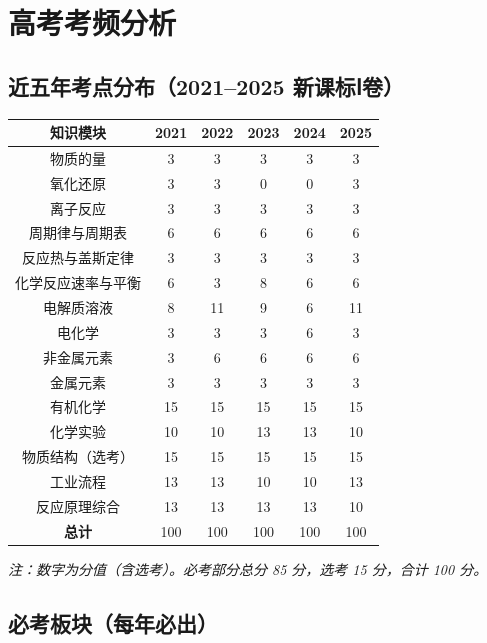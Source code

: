\section{高考考频分析}

\subsection{近五年考点分布（2021--2025 新课标Ⅰ卷）}

\begin{center}
\begin{tabular}{c|c|c|c|c|c}
\textbf{知识模块} & \textbf{2021} & \textbf{2022} & \textbf{2023} & \textbf{2024} & \textbf{2025} \\ \hline
物质的量 & 3 & 3 & 3 & 3 & 3 \\
氧化还原 & 3 & 3 & 0 & 0 & 3 \\
离子反应 & 3 & 3 & 3 & 3 & 3 \\
周期律与周期表 & 6 & 6 & 6 & 6 & 6 \\
反应热与盖斯定律 & 3 & 3 & 3 & 3 & 3 \\
化学反应速率与平衡 & 6 & 3 & 8 & 6 & 6 \\
电解质溶液 & 8 & 11 & 9 & 6 & 11 \\
电化学 & 3 & 3 & 3 & 6 & 3 \\
非金属元素 & 3 & 6 & 6 & 6 & 6 \\
金属元素 & 3 & 3 & 3 & 3 & 3 \\
有机化学 & 15 & 15 & 15 & 15 & 15 \\
化学实验 & 10 & 10 & 13 & 13 & 10 \\
物质结构（选考） & 15 & 15 & 15 & 15 & 15 \\
工业流程 & 13 & 13 & 10 & 10 & 13 \\
反应原理综合 & 13 & 13 & 13 & 13 & 10 \\ \hline
\textbf{总计} & 100 & 100 & 100 & 100 & 100
\end{tabular}
\end{center}

\textit{注：数字为分值（含选考）。必考部分总分 85 分，选考 15 分，合计 100 分。}

\subsection{必考板块（每年必出）}

